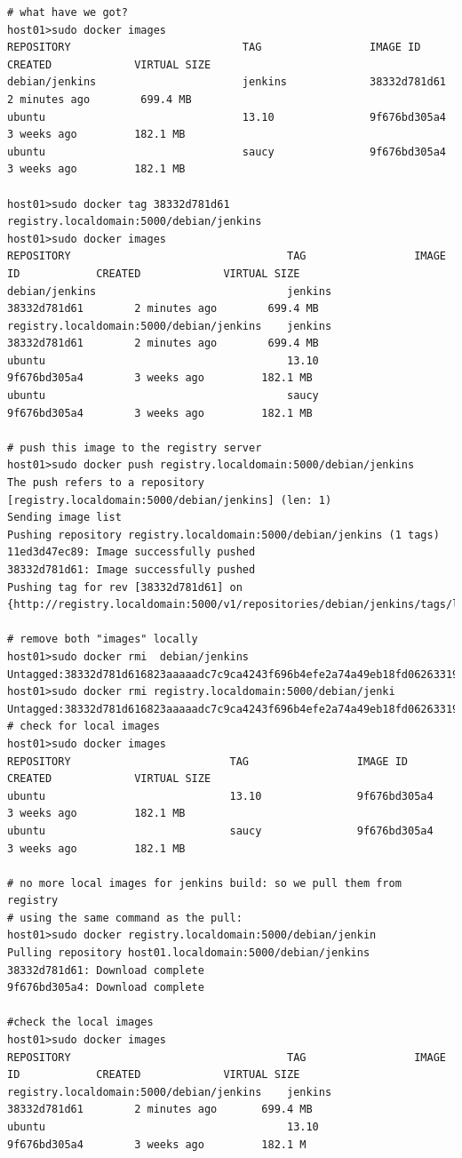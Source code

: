 \documentclass[11pt]{article}
\begin{document}
\begin{verbatim}
# what have we got?
host01>sudo docker images
REPOSITORY                           TAG                 IMAGE ID            CREATED             VIRTUAL SIZE
debian/jenkins                       jenkins             38332d781d61        2 minutes ago        699.4 MB
ubuntu                               13.10               9f676bd305a4        3 weeks ago         182.1 MB
ubuntu                               saucy               9f676bd305a4        3 weeks ago         182.1 MB

host01>sudo docker tag 38332d781d61 registry.localdomain:5000/debian/jenkins
host01>sudo docker images 
REPOSITORY                                  TAG                 IMAGE ID            CREATED             VIRTUAL SIZE
debian/jenkins                              jenkins             38332d781d61        2 minutes ago        699.4 MB
registry.localdomain:5000/debian/jenkins    jenkins             38332d781d61        2 minutes ago        699.4 MB
ubuntu                                      13.10               9f676bd305a4        3 weeks ago         182.1 MB
ubuntu                                      saucy               9f676bd305a4        3 weeks ago         182.1 MB

# push this image to the registry server
host01>sudo docker push registry.localdomain:5000/debian/jenkins
The push refers to a repository [registry.localdomain:5000/debian/jenkins] (len: 1)
Sending image list
Pushing repository registry.localdomain:5000/debian/jenkins (1 tags)
11ed3d47ec89: Image successfully pushed 
38332d781d61: Image successfully pushed 
Pushing tag for rev [38332d781d61] on {http://registry.localdomain:5000/v1/repositories/debian/jenkins/tags/latest}

# remove both "images" locally
host01>sudo docker rmi  debian/jenkins
Untagged:38332d781d616823aaaaadc7c9ca4243f696b4efe2a74a49eb18fd062633198d
host01>sudo docker rmi registry.localdomain:5000/debian/jenki
Untagged:38332d781d616823aaaaadc7c9ca4243f696b4efe2a74a49eb18fd062633198d
# check for local images
host01>sudo docker images
REPOSITORY                         TAG                 IMAGE ID            CREATED             VIRTUAL SIZE
ubuntu                             13.10               9f676bd305a4        3 weeks ago         182.1 MB
ubuntu                             saucy               9f676bd305a4        3 weeks ago         182.1 MB

# no more local images for jenkins build: so we pull them from registry
# using the same command as the pull:
host01>sudo docker registry.localdomain:5000/debian/jenkin
Pulling repository host01.localdomain:5000/debian/jenkins
38332d781d61: Download complete 
9f676bd305a4: Download complete

#check the local images
host01>sudo docker images
REPOSITORY                                  TAG                 IMAGE ID            CREATED             VIRTUAL SIZE
registry.localdomain:5000/debian/jenkins    jenkins             38332d781d61        2 minutes ago       699.4 MB
ubuntu                                      13.10               9f676bd305a4        3 weeks ago         182.1 M
\end{verbatim}
\end{document}
